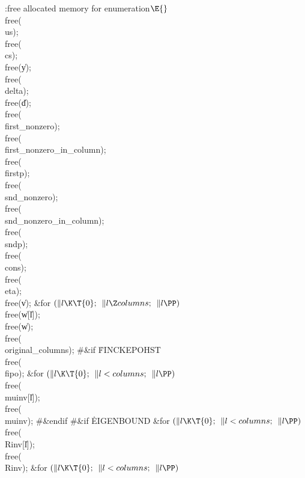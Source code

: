 \B{}:free allocated memory for enumeration\X${}\E{}$\6
\\{free}(\\{us});\6
\\{free}(\\{cs});\6
\\{free}(\|y);\6
\\{free}(\\{delta});\6
\\{free}(\|d);\6
\\{free}(\\{first\_nonzero});\6
\\{free}(\\{first\_nonzero\_in\_column});\6
\\{free}(\\{firstp});\6
\\{free}(\\{snd\_nonzero});\6
\\{free}(\\{snd\_nonzero\_in\_column});\6
\\{free}(\\{sndp});\6
\\{free}(\\{cons});\6
\\{free}(\\{eta});\6
\\{free}(\|v);\6
\&{for} ${}(\|l\K\T{0};{}$ ${}\|l\Z\\{columns};{}$ ${}\|l\PP){}$\1\5
\\{free}(\|w[\|l]);\2\6
\\{free}(\|w);\6
\\{free}(\\{original\_columns});\6
\8\#\&{if} \.{FINCKEPOHST}\6
\\{free}(\\{fipo});\6
\&{for} ${}(\|l\K\T{0};{}$ ${}\|l<\\{columns};{}$ ${}\|l\PP){}$\1\5
\\{free}(\\{muinv}[\|l]);\2\6
\\{free}(\\{muinv});\6
\8\#\&{endif}\6
\8\#\&{if} \.{EIGENBOUND}\6
\&{for} ${}(\|l\K\T{0};{}$ ${}\|l<\\{columns};{}$ ${}\|l\PP){}$\1\5
\\{free}(\\{Rinv}[\|l]);\2\6
\\{free}(\\{Rinv});\6
\&{for} ${}(\|l\K\T{0};{}$ ${}\|l<\\{columns};{}$ ${}\|l\PP){}$\1\5
